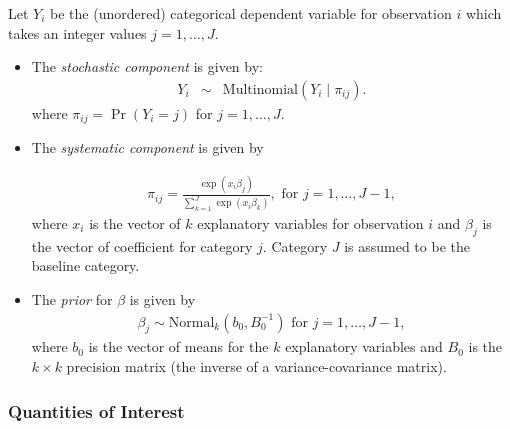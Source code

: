 Let $Y_{i}$ be the (unordered) categorical dependent variable for observation 
$i$ which takes an integer values $j=1, \ldots, J$.

\begin{itemize}
\item The \emph{stochastic component} is given by:
\begin{eqnarray*}
Y_{i} &\sim& \textrm{Multinomial}(Y_i \mid \pi_{ij}).
\end{eqnarray*}
where $\pi_{ij}=\Pr(Y_i=j)$ for $j=1, \ldots, J$.

\item The \emph{systematic component} is given by

\begin{eqnarray*}
\pi_{ij}=\frac{\exp(x_i\beta_j)}{\sum_{k=1}^J \exp(x_i\beta_k)},
\textrm{ for } j=1,\ldots, J-1,
\end{eqnarray*}
where $x_{i}$ is the vector of $k$ explanatory variables for
observation $i$ and $\beta_j$ is the vector of coefficient for
category $j$. Category $J$ is assumed to be the baseline category.

\item The \emph{prior} for $\beta$ is given by
\begin{eqnarray*}
\beta_j \sim \textrm{Normal}_k\left(  b_{0},B_{0}^{-1}\right) 
\textrm{ for } j = 1, \ldots, J-1,
\end{eqnarray*}
where $b_{0}$ is the vector of means for the $k$ explanatory variables
and $B_{0}$ is the $k \times k$ precision matrix (the inverse of a
variance-covariance matrix).
\end{itemize}

\subsubsection{Quantities of Interest}

